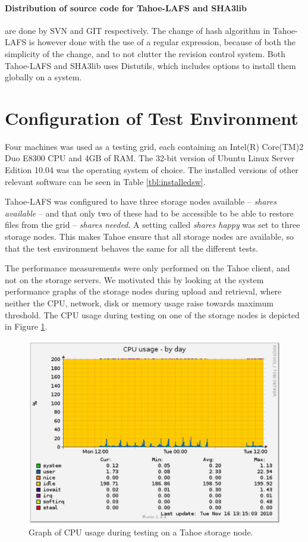 \documentclass[english,12pt,a4paper]{book}
\begin{document}
\paragraph{Distribution of source code for Tahoe-LAFS and SHA3lib} are done by
\ac{SVN} and GIT respectively. The change of hash algorithm in Tahoe-LAFS is
however done with the use of a regular expression, because of both the
simplicity of the change, and to not clutter the revision control system. Both
Tahoe-LAFS and SHA3lib uses \ac{Distutils}, which includes options to install
them globally on a system.

\section{Configuration of Test Environment}

Four machines was used as a testing grid, each containing an Intel(R) Core(TM)2
Duo E8300 \ac{CPU} and 4GB of \ac{RAM}. The 32-bit version of Ubuntu Linux
Server Edition 10.04 was the operating system of choice. The installed versions
of other relevant software can be seen in Table \ref{tbl:installedsw}.



Tahoe-\ac{LAFS} was configured to have three storage nodes available --
\emph{shares available} -- and that only two of these had to be accessible to be
able to restore files from the grid -- \emph{shares needed}. A setting called
\emph{shares happy} was set to three storage nodes. This makes Tahoe ensure that
all storage nodes are available, so that the test environment behaves the same
for all the different tests.

The performance measurements were only performed on the Tahoe client, and not on
the storage servers. We motivated this by looking at the system performance
graphs of the storage nodes during upload and retrieval, where neither the
\ac{CPU}, network, disk or memory usage raise towards maximum threshold. The
\ac{CPU} usage during testing on one of the storage nodes is depicted in Figure
\ref{fig:munin:storagenode}.

\begin{figure}[h!]
    \centering
    \includegraphics[width=0.8\columnwidth]{munin-tahoe05-cpuday.png}
    \caption{Graph of CPU usage during testing on a Tahoe storage node.}
    \label{fig:munin:storagenode}
\end{figure}
\end{document}
